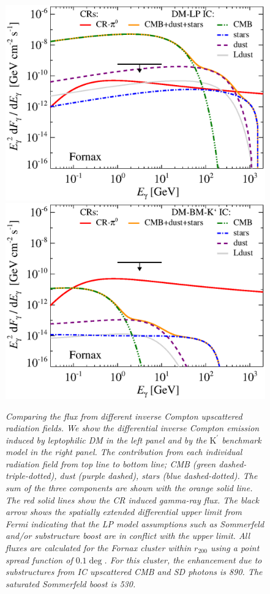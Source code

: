\documentclass[10pt,aps,pra,reprint,amsmath,amsfonts,amssymb,showpacs,nofootinbib,floatfix]{revtex4-1}
\newcommand{\Fermi}{{\em Fermi}\xspace}
\newcommand{\rmn}{\mathrm}
\newcommand{\Kp}{\rmn{K}^\prime}
\newcommand{\rvir}{r_{200}}
\begin{document}
\begin{figure}
\begin{minipage}{2.0\columnwidth}
\includegraphics[width=0.49\columnwidth]{figures/flux.IRcomp.v14.0.1deg.1.6T.SubMass.elmu.SF700.noMW.woGal.eps}
\includegraphics[width=0.49\columnwidth]{figures/flux.IRcomp.BMv14.0.1deg.SubMass.noMW.woGal.eps}
\caption{\it Comparing the flux from different inverse Compton
  upscattered radiation fields. We show the differential inverse
  Compton emission induced by leptophilic DM in the left panel and by
  the $\Kp$ benchmark model in the right panel. The contribution from
  each individual radiation field from top line to bottom line; CMB
  (green dashed-triple-dotted), dust (purple dashed), stars (blue
  dashed-dotted). The sum of the three components are shown with the
  orange solid line. The red solid lines show the CR induced gamma-ray
  flux. The black arrow shows the spatially extended differential
  upper limit from \Fermi \protect \cite{2010ApJ...717L..71A}
  indicating that the LP model assumptions such as Sommerfeld and/or
  substructure boost are in conflict with the upper limit. All fluxes
  are calculated for the Fornax cluster within $\rvir$ using a point
  spread function of $0.1\deg$. For this cluster, the enhancement due
  to substructures from IC upscattered CMB and SD photons is 890. The
  saturated Sommerfeld boost is 530.}
 \label{fig:IR_comp}
\end{minipage}
\end{figure}
\end{document}
